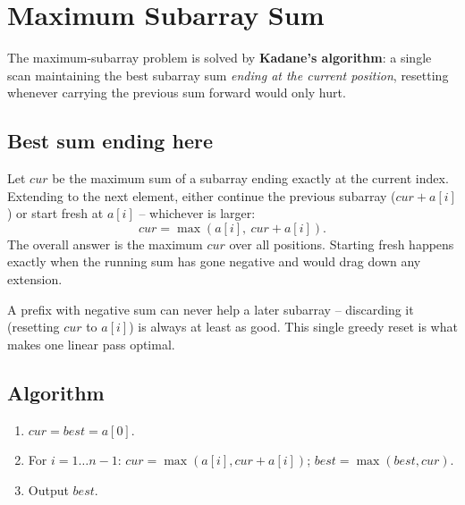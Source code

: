 \section{Maximum Subarray Sum}
\label{sec:cses-maximum-subarray-sum}


\begin{patternbox}
The maximum-subarray problem is solved by \textbf{Kadane's algorithm}: a
single scan maintaining the best subarray sum \emph{ending at the current
position}, resetting whenever carrying the previous sum forward would only
hurt.
\end{patternbox}

\subsection*{Best sum ending here}

Let $\textit{cur}$ be the maximum sum of a subarray ending exactly at the
current index. Extending to the next element, either continue the previous
subarray ($\textit{cur}+a[i]$) or start fresh at $a[i]$ -- whichever is
larger:
\[
  \textit{cur}=\max(a[i],\ \textit{cur}+a[i]).
\]
The overall answer is the maximum $\textit{cur}$ over all positions.
Starting fresh happens exactly when the running sum has gone negative and
would drag down any extension.

\begin{ideabox}
A prefix with negative sum can never help a later subarray -- discarding it
(resetting $\textit{cur}$ to $a[i]$) is always at least as good. This single
greedy reset is what makes one linear pass optimal.
\end{ideabox}

\subsection*{Algorithm}

\begin{enumerate}
  \item $\textit{cur}=\textit{best}=a[0]$.
  \item For $i=1\ldots n-1$: $\textit{cur}=\max(a[i],\textit{cur}+a[i])$;
        $\textit{best}=\max(\textit{best},\textit{cur})$.
  \item Output $\textit{best}$.
\end{enumerate}

